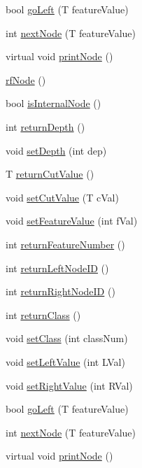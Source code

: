 \begin{DoxyCompactItemize}
bool \hyperlink{classrfNode_a973b8c555b2b07873b588dd4bc307605}{go\+Left} (T feature\+Value)
\item 
int \hyperlink{classrfNode_a1be14784687b46395585c9513748143d}{next\+Node} (T feature\+Value)
\item 
virtual void \hyperlink{classrfNode_afaa1b6e358070f895504f4faaefe5f37}{print\+Node} ()
\item 
\hyperlink{classrfNode_afdc668c17dc9190635c088b54f251732}{rf\+Node} ()
\item 
bool \hyperlink{classrfNode_a1df9f7bc841c6df1ef5aa67a72c6d09c}{is\+Internal\+Node} ()
\item 
int \hyperlink{classrfNode_a0e95db0d0008bf347f53343cbcd5a38e}{return\+Depth} ()
\item 
void \hyperlink{classrfNode_a3de3a667502b31a45f90e92a7ae767e8}{set\+Depth} (int dep)
\item 
T \hyperlink{classrfNode_a8d51a6acaff3d3dca74881b55743884f}{return\+Cut\+Value} ()
\item 
void \hyperlink{classrfNode_aa37983f12ed98b25ff306313b93bb249}{set\+Cut\+Value} (T c\+Val)
\item 
void \hyperlink{classrfNode_a6a713bccdf5e59978075b0171bdaae73}{set\+Feature\+Value} (int f\+Val)
\item 
int \hyperlink{classrfNode_a060b06548e267392449252e14e9edab1}{return\+Feature\+Number} ()
\item 
int \hyperlink{classrfNode_a97148e8fd84a37471ab7ad5e7bdc12a4}{return\+Left\+Node\+ID} ()
\item 
int \hyperlink{classrfNode_aef5c965bd9810b3573057d611dcca7f5}{return\+Right\+Node\+ID} ()
\item 
int \hyperlink{classrfNode_aa43edab3527a456028116928e83b123d}{return\+Class} ()
\item 
void \hyperlink{classrfNode_a61c8f87f97999e0123a1f4655ffedd15}{set\+Class} (int class\+Num)
\item 
void \hyperlink{classrfNode_a959c72aff3d20ca0552d2369e7d88188}{set\+Left\+Value} (int L\+Val)
\item 
void \hyperlink{classrfNode_a473dc8da457727bc50dea408320e6993}{set\+Right\+Value} (int R\+Val)
\item 
bool \hyperlink{classrfNode_a973b8c555b2b07873b588dd4bc307605}{go\+Left} (T feature\+Value)
\item 
int \hyperlink{classrfNode_a1be14784687b46395585c9513748143d}{next\+Node} (T feature\+Value)
\item 
virtual void \hyperlink{classrfNode_afaa1b6e358070f895504f4faaefe5f37}{print\+Node} ()
\end{DoxyCompactItemize}
